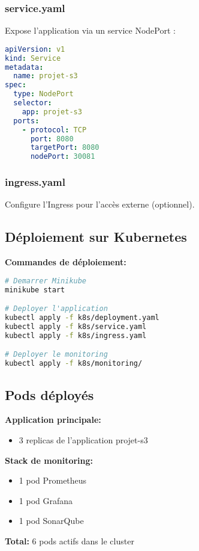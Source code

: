 \documentclass[12pt,a4paper]{article}
\begin{document}
\subsubsection{service.yaml}
Expose l'application via un service NodePort :
\begin{lstlisting}[language=yaml]
apiVersion: v1
kind: Service
metadata:
  name: projet-s3
spec:
  type: NodePort
  selector:
    app: projet-s3
  ports:
    - protocol: TCP
      port: 8080
      targetPort: 8080
      nodePort: 30081
\end{lstlisting}

\subsubsection{ingress.yaml}
Configure l'Ingress pour l'accès externe (optionnel).

\subsection{Déploiement sur Kubernetes}

\textbf{Commandes de déploiement:}
\begin{lstlisting}[language=bash]
# Demarrer Minikube
minikube start

# Deployer l'application
kubectl apply -f k8s/deployment.yaml
kubectl apply -f k8s/service.yaml
kubectl apply -f k8s/ingress.yaml

# Deployer le monitoring
kubectl apply -f k8s/monitoring/
\end{lstlisting}

\subsection{Pods déployés}

\begin{tcolorbox}[colback=green!5!white,colframe=green!75!black,title=Pods déployés]
    \textbf{Application principale:}
    \begin{itemize}
        \item 3 replicas de l'application projet-s3
    \end{itemize}
    
    \textbf{Stack de monitoring:}
    \begin{itemize}
        \item 1 pod Prometheus
        \item 1 pod Grafana
        \item 1 pod SonarQube
    \end{itemize}
    
    \textbf{Total:} 6 pods actifs dans le cluster
\end{tcolorbox}
\end{document}
